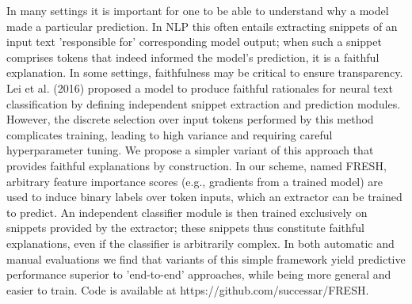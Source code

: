 In many settings it is important for one to be able to understand why a model made a particular prediction. In NLP this often entails extracting snippets of an input text 'responsible for' corresponding model output; when such a snippet comprises tokens that indeed informed the model's prediction, it is a faithful explanation. In some settings, faithfulness may be critical to ensure transparency. Lei et al. (2016) proposed a model to produce faithful rationales for neural text classification by defining independent snippet extraction and prediction modules. However, the discrete selection over input tokens performed by this method complicates training, leading to high variance and requiring careful hyperparameter tuning. We propose a simpler variant of this approach that provides faithful explanations by construction. In our scheme, named FRESH, arbitrary feature importance scores (e.g., gradients from a trained model) are used to induce binary labels over token inputs, which an extractor can be trained to predict. An independent classifier module is then trained exclusively on snippets provided by the extractor; these snippets thus constitute faithful explanations, even if the classifier is arbitrarily complex. In both automatic and manual evaluations we find that variants of this simple framework yield predictive performance superior to 'end-to-end' approaches, while being more general and easier to train. Code is available at https://github.com/successar/FRESH.
